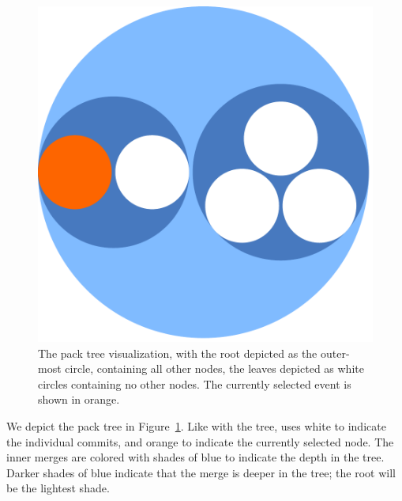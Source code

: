 \begin{figure}[htpb]
  \centering
  \includegraphics[width=0.8\figwidth]{figures/linvis/linvis_bubble.pdf}
  \caption{The pack tree visualization, with the root depicted as the
    outer-most circle, containing all other nodes, the leaves depicted
    as white circles containing no other nodes. The currently selected
    event is shown in orange.}
  \label{fig:linvis_pack}
\end{figure}

We depict the pack tree in Figure~\ref{fig:linvis_pack}. Like with the
\rt tree, \tool uses white to indicate the individual commits, and
orange to indicate the currently selected node. The inner merges are
colored with shades of blue to indicate the depth in the tree. Darker
shades of blue indicate that the merge is deeper in the tree; the root
will be the lightest shade.
